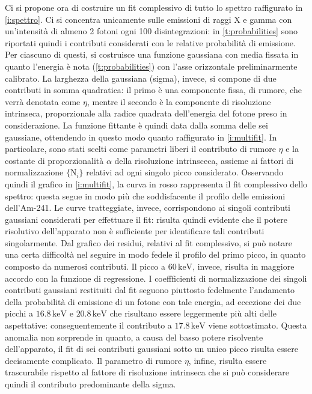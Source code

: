 \documentclass[twocolumn,10pt]{asme2ej}
\begin{document}
Ci si propone ora di costruire un fit complessivo di tutto lo spettro raffigurato in \autoref{i:spettro}. Ci si
concentra unicamente sulle emissioni di raggi X e gamma con un'intensità di almeno 2 fotoni ogni 100 disintegrazioni: in
\autoref{t:probabilities} sono riportati quindi i contributi considerati con le relative probabilità di emissione. Per
ciascuno di questi, si costruisce una funzione gaussiana con media fissata in quanto l'energia è nota
(\autoref{t:probabilities}) con l'asse orizzontale preliminarmente calibrato. La larghezza della gaussiana (sigma),
invece, si compone di due contributi in somma quadratica: il primo è una componente fissa, di rumore, che verrà denotata
come $\eta$, mentre il secondo è la componente di risoluzione intrinseca, proporzionale alla radice quadrata
dell'energia del fotone preso in considerazione. La funzione fittante è quindi data dalla somma delle sei gaussiane,
ottendendo in questo modo quanto raffigurato in \autoref{i:multifit}. In particolare, sono stati scelti come parametri
liberi il contributo di rumore $\eta$ e la costante di proporzionalità $\alpha$ della risoluzione intrinsceca, assieme
ai fattori di normalizzazione $\{\text{N}_i\}$ relativi ad ogni singolo picco considerato. Osservando quindi il grafico
in \autoref{i:multifit}, la curva in rosso rappresenta il fit complessivo dello spettro: questa segue in modo più che
soddisfacente il profilo delle emissioni dell'Am-241. Le curve tratteggiate, invece, corrispondono ai singoli contributi
gaussiani considerati per effettuare il fit: risulta quindi evidente che il potere risolutivo dell'apparato non è
sufficiente per identificare tali contributi singolarmente. Dal grafico dei residui, relativi al fit complessivo, si può
notare una certa difficoltà nel seguire in modo fedele il profilo del primo picco, in quanto composto da numerosi
contributi. Il picco a $60\,\si{\kilo\electronvolt}$, invece, risulta in maggiore accordo con la funzione di
regressione. I coeffficienti di normalizzazione dei singoli contributi gaussiani restituiti dal fit seguono piuttosto
fedelmente l'andamento della probabilità di emissione di un fotone con tale energia, ad eccezione dei due picchi a
$16.8\,\si{\kilo\electronvolt}$ e $20.8\,\si{\kilo\electronvolt}$ che risultano essere leggermente più alti delle
aspettative: conseguentemente il contributo a $17.8\,\si{\kilo\electronvolt}$ viene sottostimato. Questa anomalia non
sorprende in quanto, a causa del basso potere risolvente dell'apparato, il fit di sei contributi gaussiani sotto un
unico picco risulta essere decisamente complicato. Il parametro di rumore $\eta$, infine, risulta essere trascurabile
rispetto al fattore di risoluzione intrinseca che si può considerare quindi il contributo predominante della sigma. 
\end{document}
